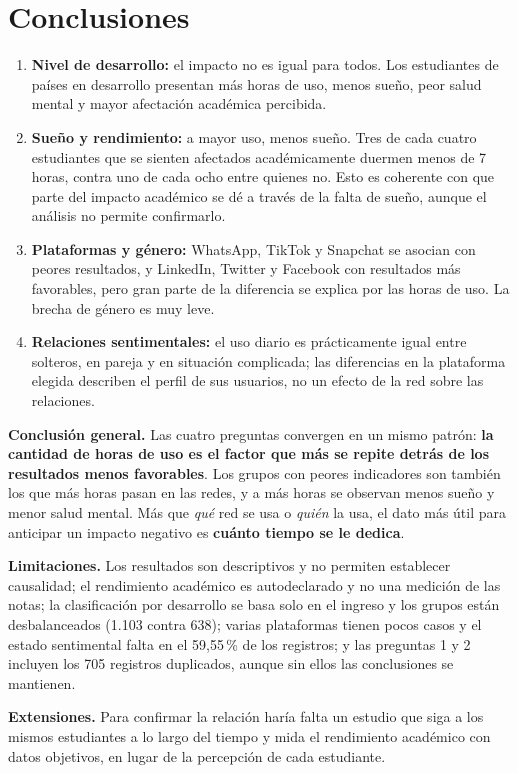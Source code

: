 \section{Conclusiones}

\begin{enumerate}[label=\arabic*.]
  \item \textbf{Nivel de desarrollo:} el impacto no es igual para todos. Los estudiantes de países en
  desarrollo presentan más horas de uso, menos sueño, peor salud mental y mayor afectación académica percibida.
  \item \textbf{Sueño y rendimiento:} a mayor uso, menos sueño. Tres de cada cuatro estudiantes que se sienten
  afectados académicamente duermen menos de 7 horas, contra uno de cada ocho entre quienes no. Esto es
  coherente con que parte del impacto académico se dé a través de la falta de sueño, aunque el análisis no
  permite confirmarlo.
  \item \textbf{Plataformas y género:} WhatsApp, TikTok y Snapchat se asocian con peores resultados, y
  LinkedIn, Twitter y Facebook con resultados más favorables, pero gran parte de la diferencia se explica por
  las horas de uso. La brecha de género es muy leve.
  \item \textbf{Relaciones sentimentales:} el uso diario es prácticamente igual entre solteros, en pareja y en
  situación complicada; las diferencias en la plataforma elegida describen el perfil de sus usuarios, no un
  efecto de la red sobre las relaciones.
\end{enumerate}

\begin{hallazgo}
\textbf{Conclusión general.} Las cuatro preguntas convergen en un mismo patrón: \textbf{la cantidad de horas
de uso es el factor que más se repite detrás de los resultados menos favorables}. Los grupos con peores
indicadores son también los que más horas pasan en las redes, y a más horas se observan menos sueño y menor
salud mental. Más que \emph{qué} red se usa o \emph{quién} la usa, el dato más útil para anticipar un impacto
negativo es \textbf{cuánto tiempo se le dedica}.
\end{hallazgo}

\textbf{Limitaciones.} Los resultados son descriptivos y no permiten establecer causalidad; el rendimiento
académico es autodeclarado y no una medición de las notas; la clasificación por desarrollo se basa solo en el
ingreso y los grupos están desbalanceados (1.103 contra 638); varias plataformas tienen pocos casos y el estado
sentimental falta en el 59,55\,\% de los registros; y las preguntas 1 y 2 incluyen los 705 registros
duplicados, aunque sin ellos las conclusiones se mantienen.

\textbf{Extensiones.} Para confirmar la relación haría falta un estudio que siga a los mismos estudiantes a lo
largo del tiempo y mida el rendimiento académico con datos objetivos, en lugar de la percepción de cada
estudiante.
